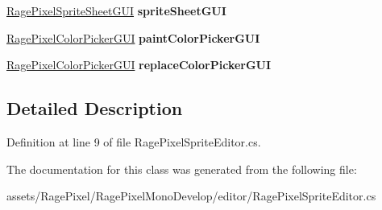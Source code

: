 \begin{DoxyCompactItemize}
\item 
\hypertarget{class_rage_pixel_sprite_editor_afe0768b737d8ea57833ec078c094e628}{\hyperlink{class_rage_pixel_sprite_sheet_g_u_i}{Rage\-Pixel\-Sprite\-Sheet\-G\-U\-I} {\bfseries sprite\-Sheet\-G\-U\-I}}\label{class_rage_pixel_sprite_editor_afe0768b737d8ea57833ec078c094e628}

\item 
\hypertarget{class_rage_pixel_sprite_editor_a77d755c98139a5778aa663370f0f379b}{\hyperlink{class_rage_pixel_color_picker_g_u_i}{Rage\-Pixel\-Color\-Picker\-G\-U\-I} {\bfseries paint\-Color\-Picker\-G\-U\-I}}\label{class_rage_pixel_sprite_editor_a77d755c98139a5778aa663370f0f379b}

\item 
\hypertarget{class_rage_pixel_sprite_editor_a8e27152ebda2379cad1f19a1a4017fbf}{\hyperlink{class_rage_pixel_color_picker_g_u_i}{Rage\-Pixel\-Color\-Picker\-G\-U\-I} {\bfseries replace\-Color\-Picker\-G\-U\-I}}\label{class_rage_pixel_sprite_editor_a8e27152ebda2379cad1f19a1a4017fbf}

\end{DoxyCompactItemize}


\subsection{Detailed Description}


Definition at line 9 of file Rage\-Pixel\-Sprite\-Editor.\-cs.



The documentation for this class was generated from the following file\-:\begin{DoxyCompactItemize}
\item 
assets/\-Rage\-Pixel/\-Rage\-Pixel\-Mono\-Develop/editor/Rage\-Pixel\-Sprite\-Editor.\-cs\end{DoxyCompactItemize}
